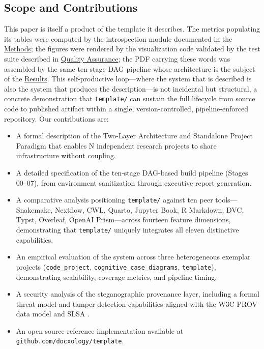 \documentclass[
]{article}
\providecommand{\tightlist}{%
  \setlength{\itemsep}{0pt}\setlength{\parskip}{0pt}}
\begin{document}
\subsection{Scope and Contributions}\label{scope-and-contributions}

This paper is itself a product of the template it describes. The metrics
populating its tables were computed by the introspection module
documented in the \href{03a_architecture.md\#methods}{Methods}; the
figures were rendered by the visualization code validated by the test
suite described in \href{03e_quality.md\#quality-assurance}{Quality
Assurance}; the PDF carrying these words was assembled by the same
ten-stage DAG pipeline whose architecture is the subject of the
\href{04_results.md\#results}{Results}. This self-productive
loop---where the system that is described is also the system that
produces the description---is not incidental but structural, a concrete
demonstration that \texttt{template/} can sustain the full lifecycle
from source code to published artifact within a single,
version-controlled, pipeline-enforced repository. Our contributions are:

\begin{itemize}
\tightlist
\item
  A formal description of the Two-Layer Architecture and Standalone
  Project Paradigm that enables N independent research projects to share
  infrastructure without coupling.
\item
  A detailed specification of the ten-stage DAG-based build pipeline
  (Stages 00--07), from environment sanitization through executive
  report generation.
\item
  A comparative analysis positioning \texttt{template/} against ten peer
  tools---Snakemake, Nextflow, CWL, Quarto, Jupyter Book, R Markdown,
  DVC, Typst, Overleaf, OpenAI Prism---across fourteen feature
  dimensions, demonstrating that \texttt{template/} uniquely integrates
  all eleven distinctive capabilities.
\item
  An empirical evaluation of the system across three heterogeneous
  exemplar projects (\texttt{code\_project},
  \texttt{cognitive\_case\_diagrams}, \texttt{template}), demonstrating
  scalability, coverage metrics, and pipeline timing.
\item
  A security analysis of the steganographic provenance layer, including
  a formal threat model and tamper-detection capabilities aligned with
  the W3C PROV data model \citep{moreau2013provdm} and SLSA
  \citep{openssf2023slsa}.
\item
  An open-source reference implementation available at
  \texttt{github.com/docxology/template}.
\end{itemize}
\end{document}
